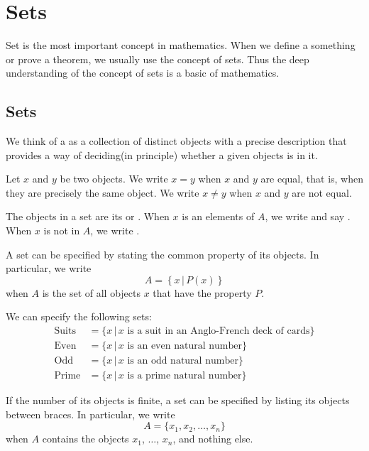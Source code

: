 
\chapter{Sets}\label{chap:sets}

Set is the most important concept in mathematics.
When we define a something or prove a theorem, we usually use the concept of sets.
Thus the deep understanding of the concept of sets is a basic of mathematics.

\section{Sets}

We think of a  as a collection of distinct objects with a precise description that
provides a way of deciding(in principle) whether a given objects is in it.

Let $x$ and $y$ be two objects.
We write $x=y$ when $x$ and $y$ are equal,
that is, when they are precisely the same object.
We write $x\neq y$ when $x$ and $y$ are not equal.

\begin{defn}
The objects in a set are its  or .
When $x$ is an elements of $A$, we write  and say .
When $x$ is not in $A$, we write .
\end{defn}
%
%
A set can be specified by stating the common property of its objects.
In particular, we write
\[
A=\left\{x\,\vert\, P(x)\right\}
\]
when $A$ is the set of all objects $x$ that have the property $P$.

\begin{eg}
We can specify the following sets:
\begin{align*}
\text{Suits} & = \{x\, \vert\, \text{$x$ is a suit in an Anglo-French deck of cards}\}\\
\text{Even} & = \{x\, \vert\, \text{$x$ is an even natural number}\}\\
\text{Odd} & = \{x\, \vert\, \text{$x$ is an odd natural number}\}\\
\text{Prime} & = \{x\, \vert\, \text{$x$ is a prime natural number}\}
\end{align*}
\end{eg}
%
%
If the number of its objects is finite, a set can be specified by listing its objects
between braces. In particular, we write
\[
A = \{x_1, x_2, \ldots, x_n\}
\]
when $A$ contains the objects $x_1$, $\ldots$, $x_n$, and nothing else.

